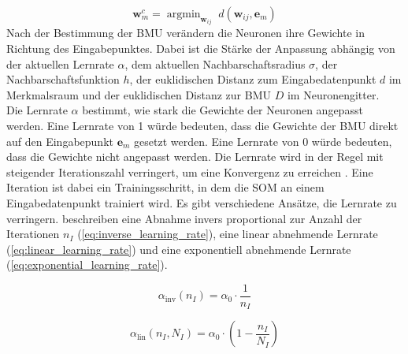 \begin{equation}
    \mathbf{w}_{m}^c = {\operatorname{argmin}_{\mathbf{w}_{ij}}} \; d(\mathbf{w}_{ij},\mathbf{e}_m)
    \label{eq:bmu}
\end{equation}
Nach der Bestimmung der BMU verändern die Neuronen ihre Gewichte in Richtung des Eingabepunktes. Dabei ist die Stärke der Anpassung abhängig von der aktuellen Lernrate $\alpha$, dem aktuellen Nachbarschaftsradius $\sigma$, der Nachbarschaftsfunktion $h$, der euklidischen Distanz zum Eingabedatenpunkt $d$ im Merkmalsraum und der euklidischen Distanz zur BMU $D$ im Neuronengitter. \\
Die Lernrate $\alpha$ bestimmt, wie stark die Gewichte der Neuronen angepasst werden. Eine Lernrate von 1 würde bedeuten, dass die Gewichte der BMU direkt auf den Eingabepunkt $\mathbf{e}_m$ gesetzt werden. Eine Lernrate von 0 würde bedeuten, dass die Gewichte nicht angepasst werden. Die Lernrate wird in der Regel mit steigender Iterationszahl verringert, um eine Konvergenz zu erreichen \parencite{kohonen_self-organizing_2001}. Eine Iteration ist dabei ein Trainingsschritt, in dem die SOM an einem Eingabedatenpunkt trainiert wird. Es gibt verschiedene Ansätze, die Lernrate zu verringern. \textcite{natita_appropriate_2016} beschreiben eine Abnahme invers proportional zur Anzahl der Iterationen $n_I$ (\ref{eq:inverse_learning_rate}), eine linear abnehmende Lernrate (\ref{eq:linear_learning_rate}) und eine exponentiell abnehmende Lernrate (\ref{eq:exponential_learning_rate}).

\begin{equation}
    \alpha_{\text{inv}}(n_I) = \alpha_0 \cdot \frac{1}{n_I}
    \label{eq:inverse_learning_rate}
\end{equation}

\begin{equation}
    \alpha_{\text{lin}}(n_I, N_I) = \alpha_0 \cdot (1 - \frac{n_I}{N_I})
    \label{eq:linear_learning_rate}
\end{equation}

